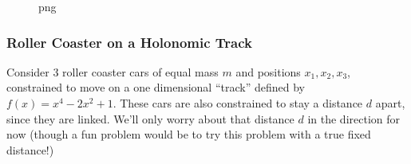 \begin{figure}
\centering
{}
\caption{png}
\end{figure}

\subsubsection{Roller Coaster on a Holonomic
Track}\label{roller-coaster-on-a-holonomic-track}

Consider 3 roller coaster cars of equal mass \(m\) and positions
\(x_1,x_2,x_3\), constrained to move on a one dimensional ``track''
defined by \(f(x) = x^4 -2x^2 + 1\). These cars are also constrained to
stay a distance \(d\) apart, since they are linked. We'll only worry
about that distance \(d\) in the direction for now (though a fun problem
would be to try this problem with a true fixed distance!)

